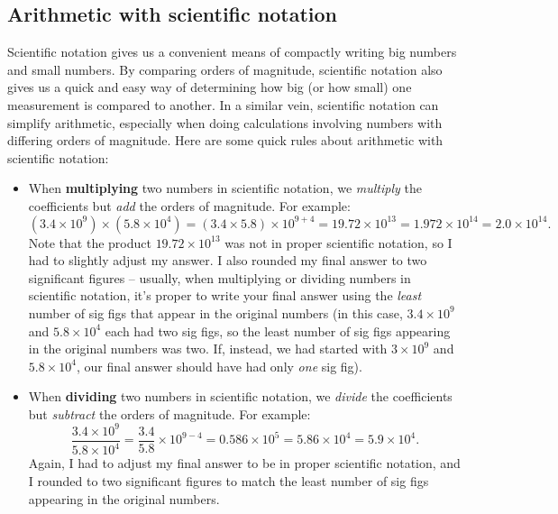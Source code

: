 \documentclass[11pt]{article}
\begin{document}
\subsection{Arithmetic with scientific notation}
Scientific notation gives us a convenient means of compactly writing big numbers and small numbers. By comparing orders of magnitude, scientific notation also gives us a quick and easy way of determining how big (or how small) one measurement is compared to another. In a similar vein, scientific notation can simplify arithmetic, especially when doing calculations involving numbers with differing orders of magnitude. Here are some quick rules about arithmetic with scientific notation:
\begin{itemize}
    \item When \textbf{multiplying} two numbers in scientific notation, we \emph{multiply} the coefficients but \emph{add} the orders of magnitude. For example:
    \begin{equation}
        (3.4 \times 10^9) \times (5.8 \times 10^4) = (3.4 \times 5.8) \times 10^{9 + 4} = 19.72 \times 10^{13} = 1.972 \times 10^{14} = \boxed{2.0 \times 10^{14}}. 
    \end{equation}
    Note that the product $19.72 \times 10^{13}$ was not in proper scientific notation, so I had to slightly adjust my answer. I also rounded my final answer to two significant figures -- usually, when multiplying or dividing numbers in scientific notation, it's proper to write your final answer using the \emph{least} number of sig figs that appear in the original numbers (in this case, $3.4 \times 10^9$ and $5.8 \times 10^4$ each had two sig figs, so the least number of sig figs appearing in the original numbers was two. If, instead, we had started with $3 \times 10^9$ and $5.8 \times 10^4$, our final answer should have had only \emph{one} sig fig).
    
    \item When \textbf{dividing} two numbers in scientific notation, we \emph{divide} the coefficients but \emph{subtract} the orders of magnitude. For example:
    \begin{equation}
        \frac{3.4 \times 10^9}{5.8 \times 10^4} = \frac{3.4}{5.8} \times 10^{9-4} = 0.586 \times 10^5 = 5.86 \times 10^4 = \boxed{5.9 \times 10^4}.
    \end{equation}
    Again, I had to adjust my final answer to be in proper scientific notation, and I rounded to two significant figures to match the least number of sig figs appearing in the original numbers.
    

\end{itemize}
\end{document}

